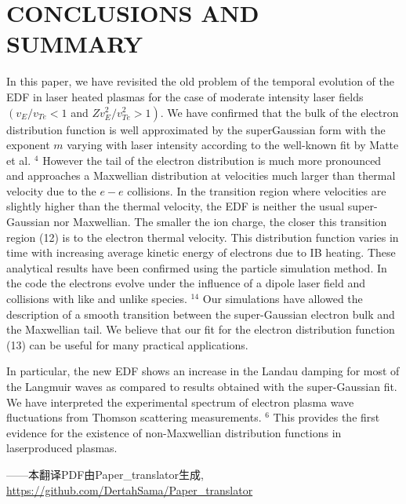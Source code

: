 \documentclass[oneside,onecolumn]{article}
\begin{document}
\begin{sloppypar}
 \section{CONCLUSIONS AND SUMMARY}
 In this paper, we have revisited the old problem of the temporal evolution of the EDF in laser heated plasmas for the case of moderate intensity laser fields $\left(v_{E} / v_{T e}<1\right.$ and $\left.Z v_{E}^{2} / v_{T e}^{2}>1\right)$. We have confirmed that the bulk of the electron distribution function is well approximated by the superGaussian form with the exponent $m$ varying with laser intensity according to the well-known fit by Matte et al. ${ }^{4}$ However the tail of the electron distribution is much more pronounced and approaches a Maxwellian distribution at velocities much larger than thermal velocity due to the $e-e$ collisions. In the transition region where velocities are slightly higher than the thermal velocity, the EDF is neither the usual super-Gaussian nor Maxwellian. The smaller the ion charge, the closer this transition region (12) is to the electron thermal velocity. This distribution function varies in time with increasing average kinetic energy of electrons due to IB heating. These analytical results have been confirmed using the particle simulation method. In the code the electrons evolve under the influence of a dipole laser field and collisions with like and unlike species. ${ }^{14}$ Our simulations have allowed the description of a smooth transition between the super-Gaussian electron bulk and the Maxwellian tail. We believe that our fit for the electron distribution function (13) can be useful for many practical applications.
 
 In particular, the new EDF shows an increase in the Landau damping for most of the Langmuir waves as compared to results obtained with the super-Gaussian fit. We have interpreted the experimental spectrum of electron plasma wave fluctuations from Thomson scattering measurements. $^{6}$ This provides the first evidence for the existence of non-Maxwellian distribution functions in laserproduced plasmas.
 
 
 
 \end{sloppypar}	
 \begin{flushright}
 	\vfill \footnotesize
 	——本翻译PDF由Paper_translator生成, \url{https://github.com/DertahSama/Paper_translator}
 \end{flushright}
 
\end{document}
